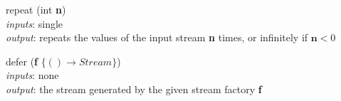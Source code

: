 \documentclass{dithesis}
\begin{document}
\begin{description}
\begin{minipage}[c]{0.4\linewidth}
\item[repeat](int \textbf{n}) \\ 
	\textit{inputs}: single \\
	\textit{output}: repeats the values of the input stream \textbf{n} times, or infinitely if $\textbf{n} < 0$ \\
\end{minipage}
\begin{minipage}[c]{0.6\linewidth}

\end{minipage}

\begin{minipage}[c]{0.4\linewidth}
\item[defer](\textbf{f} $\{ () \to Stream \}$) \\ 
	\textit{inputs}: none \\
	\textit{output}: the stream generated by the given stream factory \textbf{f}\\
\end{minipage}
\begin{minipage}[c]{0.6\linewidth}

\end{minipage}

\end{description}
\end{document}
